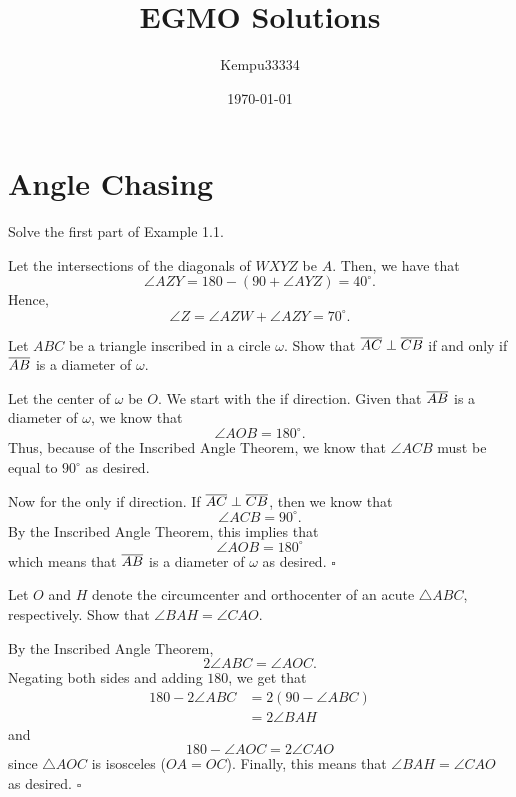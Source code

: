 \documentclass{article}
\title{EGMO Solutions}
\author{Kempu33334}
\date{\today}
\begin{document}
\maketitle

\tableofcontents

\newpage

\section{Angle Chasing}

\begin{problem}[1.5]{}
Solve the first part of Example 1.1.
\end{problem}

Let the intersections of the diagonals of $WXYZ$ be $A$. Then, we have that \[\angle AZY = 180-(90+\angle AYZ) = 40^\circ.\] Hence, \[\angle Z =\angle AZW + \angle AZY = \boxed{70^\circ}.\]

\begin{problem}[1.6]{}
Let $ABC$ be a triangle inscribed in a circle $\omega$. Show that $\overline{AC}\perp \overline{CB}$ if and only if $\overline{AB}$ is a diameter of $\omega$.
\end{problem}

Let the center of $\omega$ be $O$. We start with the if direction. Given that $\overline{AB}$ is a diameter of $\omega$, we know that \[\angle AOB = 180^\circ.\] Thus, because of the Inscribed Angle Theorem, we know that $\angle ACB$ must be equal to $90^\circ$ as desired. 

Now for the only if direction. If $\overline{AC} \perp \overline{CB}$, then we know that \[\angle ACB = 90^\circ.\] By the Inscribed Angle Theorem, this implies that \[\angle AOB = 180^\circ\] which means that $\overline{AB}$ is a diameter of $\omega$ as desired. $\square$

\begin{problem}[1.7]{}
Let $O$ and $H$ denote the circumcenter and orthocenter of an acute $\triangle ABC$, respectively. Show that $\angle BAH = \angle CAO$.
\end{problem}

By the Inscribed Angle Theorem, \[2\angle ABC = \angle AOC.\] Negating both sides and adding $180$, we get that
\begin{align*}
180-2\angle ABC &= 2(90-\angle ABC) \\
&= 2\angle BAH
\end{align*}
and \[180-\angle AOC = 2\angle CAO\] since $\triangle AOC$ is isosceles ($OA = OC$). Finally, this means that $\angle BAH = \angle CAO$ as desired. $\square$
\end{document}
